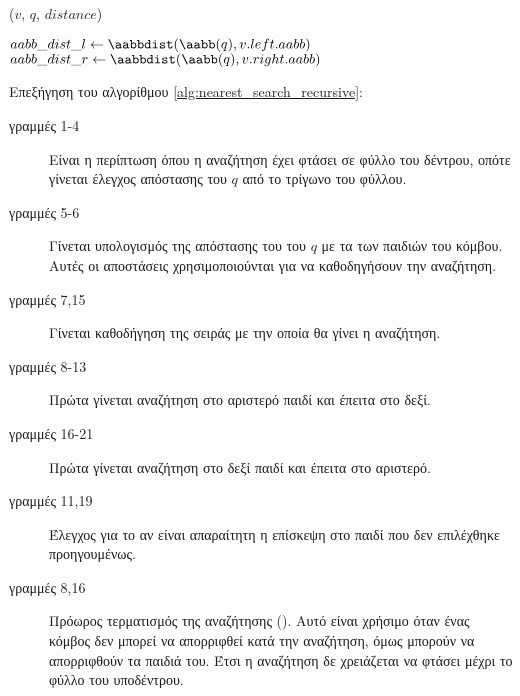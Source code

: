 \IncMargin{1.5em}
\begin{algorithm}[h]
    \caption[Αναδρομικός Υπολογισμός Απόστασης Κοντινότερου Γείτονα]{
    }
    \label{alg:nearest_search_recursive}
    \DontPrintSemicolon
    \Indm\nonl\nearestsearchrecur($v$, $q$, $distance$)\\
    \Indp

        $aabb\_dist\_l \gets \aabbdist(\aabb(q), v.left.aabb)$\;
        $aabb\_dist\_r \gets \aabbdist(\aabb(q), v.right.aabb)$\;
        \Return{}

\end{algorithm}
\DecMargin{1.5em}

Επεξήγηση του αλγορίθμου \ref{alg:nearest_search_recursive}:
\begin{description}
    \item[γραμμές 1-4] Είναι η περίπτωση όπου η αναζήτηση έχει 
    φτάσει σε φύλλο του δέντρου, οπότε γίνεται έλεγχος απόστασης 
    του $q$ από το τρίγωνο του φύλλου.
    \item[γραμμές 5-6] Γίνεται υπολογισμός της απόστασης του 
     του $q$ με τα  των παιδιών του κόμβου. 
    Αυτές οι αποστάσεις χρησιμοποιούνται για να καθοδηγήσουν 
    την αναζήτηση.
    \item[γραμμές 7,15] Γίνεται καθοδήγηση της σειράς με την 
    οποία θα γίνει η αναζήτηση.
    \item[γραμμές 8-13] Πρώτα γίνεται αναζήτηση στο αριστερό 
    παιδί και έπειτα στο δεξί.
    \item[γραμμές 16-21] Πρώτα γίνεται αναζήτηση στο δεξί 
    παιδί και έπειτα στο αριστερό.
    \item[γραμμές 11,19] Έλεγχος για το αν είναι απαραίτητη 
    η επίσκεψη στο παιδί που δεν επιλέχθηκε προηγουμένως.
    \item[γραμμές 8,16] Πρόωρος τερματισμός της 
    αναζήτησης (). 
    Αυτό είναι χρήσιμο όταν ένας κόμβος δεν μπορεί να 
    απορριφθεί κατά την αναζήτηση, όμως μπορούν να 
    απορριφθούν τα παιδιά του.
    Έτσι η αναζήτηση δε χρειάζεται να φτάσει μέχρι 
    το φύλλο του υποδέντρου.
\end{description}

